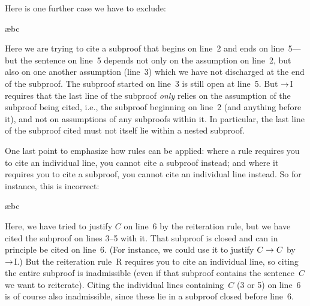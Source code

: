 Here is one further case we have to exclude:
\begin{fitchproof}
\PR
\open
	\AS
	\open
	\AS
	\ae{bc}
	\close
\close
\ifHTMLtarget
{}
\else
{}
 
\fi
\end{fitchproof}
Here we are trying to cite a subproof that begins on line~2 and ends on line~5---but the sentence on line~5 depends not only on the assumption on line~2, but also on one another assumption (line~3) which we have not discharged at the end of the subproof. The subproof started on line~3 is still open at line~5. But $\rightarrow$I requires that the last line of the subproof \emph{only} relies on the assumption of the subproof being cited, i.e., the subproof beginning on line~2 (and anything before it), and not on assumptions of any subproofs within it. In particular, the last line of the subproof cited must not itself lie within a nested subproof.


One last point to emphasize how rules can be applied: where a rule requires you to cite an individual line, you cannot cite a subproof instead; and where it requires you to cite a subproof, you cannot cite an individual line instead. So for instance, this is incorrect:
\begin{fitchproof}
\PR
\open
	\AS
	\open
	\AS
	\ae{bc}
	\close
\ifHTMLtarget
\else
{}
 
\fi
\close
{}
\end{fitchproof}
Here, we have tried to justify $C$ on line~6 by the reiteration
rule, but we have cited the subproof on lines 3--5 with it. That
subproof is closed and can in principle be cited on line~6. (For
instance, we could use it to justify $C \rightarrow C$ by $\rightarrow$I.) But the
reiteration rule~R requires you to cite an individual line, so citing
the entire subproof is inadmissible (even if that subproof contains
the sentence~$C$ we want to reiterate). Citing the individual lines
containing~$C$ (3 or 5) on line~6 is of course also inadmissible,
since these lie in a subproof closed before line~6.


